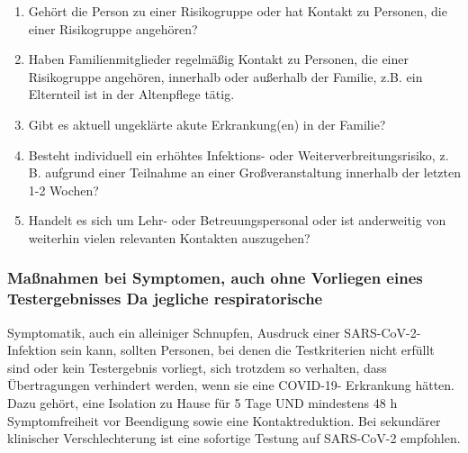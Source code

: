 \documentclass{article}
\begin{document}
\begin{enumerate}
\item Gehört die Person zu einer Risikogruppe oder hat Kontakt zu Personen, die einer Risikogruppe angehören? 


\item Haben Familienmitglieder regelmäßig Kontakt zu Personen, die einer Risikogruppe angehören, innerhalb oder außerhalb der Familie, z.B. ein Elternteil ist in der Altenpflege tätig. 


\item Gibt es aktuell ungeklärte akute Erkrankung(en) in der Familie? 


\item Besteht individuell ein erhöhtes Infektions- oder Weiterverbreitungsrisiko, z. B. aufgrund einer Teilnahme an einer Großveranstaltung innerhalb der letzten 1-2 Wochen? 


\item Handelt es sich um Lehr- oder Betreuungspersonal oder ist anderweitig von weiterhin vielen relevanten Kontakten auszugehen? 


\end{enumerate}

\subsubsection{Maßnahmen bei Symptomen, auch ohne Vorliegen eines Testergebnisses Da jegliche respiratorische}\label{H1505935}



Symptomatik, auch ein alleiniger Schnupfen, Ausdruck einer SARS-CoV-2- Infektion sein kann, sollten Personen, bei denen die Testkriterien nicht erfüllt sind oder kein Testergebnis vorliegt, sich trotzdem so verhalten, dass Übertragungen verhindert werden, wenn sie eine COVID-19- Erkrankung hätten. Dazu gehört, eine Isolation zu Hause für 5 Tage UND mindestens 48 h Symptomfreiheit vor Beendigung sowie eine Kontaktreduktion. Bei sekundärer klinischer Verschlechterung ist eine sofortige Testung auf SARS-CoV-2 empfohlen.
\end{document}
